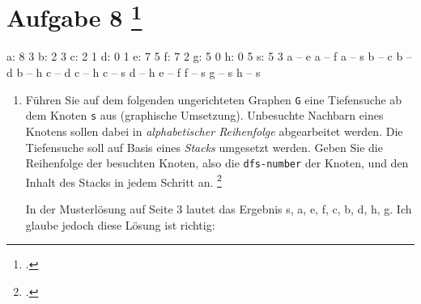 \documentclass{bschlangaul-aufgabe}
\begin{document}

\section{Aufgabe 8
\footcite[Thema 1 Aufgabe 8]{examen:46115:2014:09}
}

\begin{liGraphenFormat}
a: 8 3
b: 2 3
c: 2 1
d: 0 1
e: 7 5
f: 7 2
g: 5 0
h: 0 5
s: 5 3
a -- e
a -- f
a -- s
b -- c
b -- d
b -- h
c -- d
c -- h
c -- s
d -- h
e -- f
f -- s
g -- s
h -- s
\end{liGraphenFormat}

\begin{enumerate}


\item Führen Sie auf dem folgenden ungerichteten Graphen \texttt{G} eine
Tiefensuche ab dem Knoten \texttt{s} aus (graphische Umsetzung).
Unbesuchte Nachbarn eines Knotens sollen dabei in \emph{alphabetischer
Reihenfolge} abgearbeitet werden. Die Tiefensuche soll auf Basis eines
\emph{Stacks} umgesetzt werden. Geben Sie die
Reihenfolge der besuchten Knoten, also die \texttt{dfs-number} der
Knoten, und den Inhalt des Stacks in jedem Schritt an.
\footcite[Seite 2: Tiefensuche, Breitensuche, Aufgabe 3]{aud:ab:6}

\begin{center}
\end{center}

\begin{bAntwort}
In der Musterlösung auf Seite 3 lautet das Ergebnis s, a, e, f, c, b, d, h, g.
Ich glaube jedoch diese Lösung ist richtig:


\end{bAntwort}
\end{enumerate}
\end{document}
